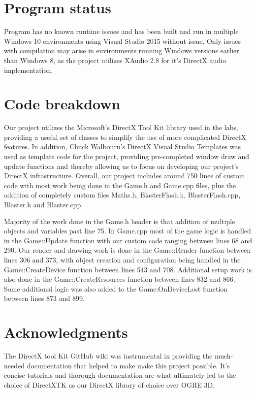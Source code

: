 \documentclass[a4paper]{scrartcl}
\begin{document}
\section{Program status}

Program has no known runtime issues and has been built and run in multiple Windows 10 environments using Visual Studio 2015 without issue. Only issues with compilation may arise in environments running Windows versions earlier than Windows 8, as the project utilizes XAudio 2.8 for it's DirectX audio implementation.

\section{Code breakdown}

Our project utilizes the Microsoft's DirectX Tool Kit\cite{directxtk} library used in the labs, providing a useful set of classes to simplify the use of more complicated DirectX features. In addition, Chuck Walbourn's DirectX Visual Studio Templates\cite{d3dtemplate} was used as template code for the project, providing pre-completed window draw and update functions and thereby allowing us to focus on developing our project's DirectX infrastructure. Overall, our project includes around 750 lines of custom code with most work being done in the Game.h and Game.cpp files, plus the addition of completely custom files Maths.h, BlasterFlash.h, BlasterFlash.cpp, Blaster.h and Blaster.cpp.

Majority of the work done in the Game.h header is that addition of multiple objects and variables past line 75. In Game.cpp most of the game logic is handled in the Game::Update function with our custom code ranging between lines 68 and 290. Our render and drawing work is done in the Game::Render function between lines 306 and 373, with object creation and configuration being handled in the Game::CreateDevice function between lines 543 and 708. Additional setup work is also done in the Game::CreateResources function between lines 832 and 866. Some additional logic was also added to the Game:OnDeviceLost function between lines 873 and 899.

\section{Acknowledgments}
The DirectX tool Kit GitHub wiki\cite{directxtkwiki} was instrumental in providing the much-needed documentation that helped to make make this project possible. It's concise tutorials and thorough documentation are what ultimately led to the choice of DirectXTK as our DirectX library of choice over OGRE 3D.

\flushleft


\end{document}
